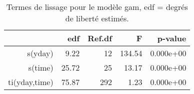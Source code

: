 \begin{table}[!ht]
\centering
\begin{tabular}{rrrrr}
  \hline
 & edf & Ref.df & F & p-value \\ 
  \hline
s(yday) & 9.22 & 12 & 134.54 & 0.000e+00 \\ 
  s(time) & 25.72 & 25 & 13.17 & 0.000e+00 \\ 
  ti(yday,time) & 75.87 & 292 & 1.23 & 0.000e+00 \\ 
   \hline
\end{tabular}
\caption{Termes de lissage pour le modèle gam, edf = degrés de liberté estimés.} 
\label{smpm.st}
\end{table}
